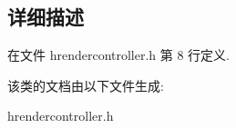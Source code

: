 \subsection{详细描述}


在文件 hrendercontroller.\+h 第 8 行定义.



该类的文档由以下文件生成\+:\begin{DoxyCompactItemize}
\item 
hrendercontroller.\+h\end{DoxyCompactItemize}
